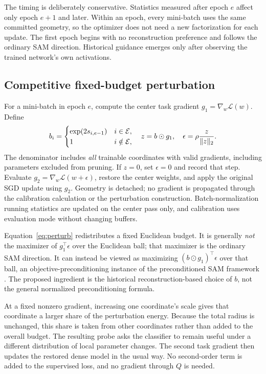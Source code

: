 The timing is deliberately conservative. Statistics measured after epoch $e$ affect only epoch $e+1$ and later. Within an epoch, every mini-batch uses the same committed geometry, so the optimizer does not need a new factorization for each update. The first epoch begins with no reconstruction preference and follows the ordinary SAM direction. Historical guidance emerges only after observing the trained network's own activations.

\subsection{Competitive fixed-budget perturbation}
For a mini-batch in epoch $e$, compute the center task gradient $g_1=\nabla_w\mathcal{L}(w)$. Define
\begin{equation}
 b_i=\begin{cases}\exp(2s_{i,e-1})&i\in\mathcal{E},\\1&i\notin\mathcal{E},\end{cases}
 \quad z=b\odot g_1,\quad
 \epsilon=\rho\frac{z}{\|z\|_2}.
 \label{eq:perturb}
\end{equation}
The denominator includes \emph{all} trainable coordinates with valid gradients, including parameters excluded from pruning. If $z=0$, set $\epsilon=0$ and record that step. Evaluate $g_2=\nabla_w\mathcal{L}(w+\epsilon)$, restore the center weights, and apply the original SGD update using $g_2$. Geometry is detached; no gradient is propagated through the calibration calculation or the perturbation construction. Batch-normalization running statistics are updated on the center pass only, and calibration uses evaluation mode without changing buffers.

Equation~\eqref{eq:perturb} redistributes a fixed Euclidean budget. It is generally \emph{not} the maximizer of $g_1^\top\epsilon$ over the Euclidean ball; that maximizer is the ordinary SAM direction. It can instead be viewed as maximizing $(b\odot g_1)^\top\epsilon$ over that ball, an objective-preconditioning instance of the preconditioned SAM framework \cite{preconditioned}. The proposed ingredient is the historical reconstruction-based choice of $b$, not the general normalized preconditioning formula.

At a fixed nonzero gradient, increasing one coordinate's scale gives that coordinate a larger share of the perturbation energy. Because the total radius is unchanged, this share is taken from other coordinates rather than added to the overall budget. The resulting probe asks the classifier to remain useful under a different distribution of local parameter changes. The second task gradient then updates the restored dense model in the usual way. No second-order term is added to the supervised loss, and no gradient through $Q$ is needed.

